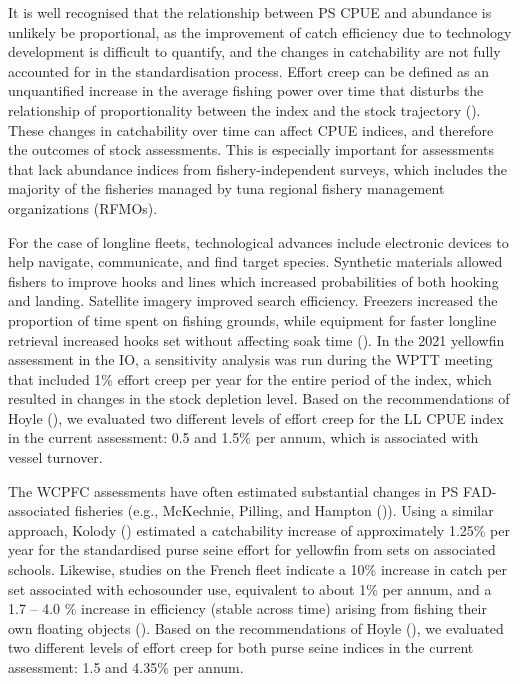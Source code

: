 \documentclass[
]{scrartcl}
\begin{document}
It is well recognised that the relationship between PS CPUE and
abundance is unlikely be proportional, as the improvement of catch
efficiency due to technology development is difficult to quantify, and
the changes in catchability are not fully accounted for in the
standardisation process. Effort creep can be defined as an unquantified
increase in the average fishing power over time that disturbs the
relationship of proportionality between the index and the stock
trajectory ().
These changes in catchability over time can affect CPUE indices, and
therefore the outcomes of stock assessments. This is especially
important for assessments that lack abundance indices from
fishery-independent surveys, which includes the majority of the
fisheries managed by tuna regional fishery management organizations
(RFMOs).

For the case of longline fleets, technological advances include
electronic devices to help navigate, communicate, and find target
species. Synthetic materials allowed fishers to improve hooks and lines
which increased probabilities of both hooking and landing. Satellite
imagery improved search efficiency. Freezers increased the proportion of
time spent on fishing grounds, while equipment for faster longline
retrieval increased hooks set without affecting soak time
(). In the 2021
yellowfin assessment in the IO, a sensitivity analysis was run during
the WPTT meeting that included 1\% effort creep per year for the entire
period of the index, which resulted in changes in the stock depletion
level. Based on the recommendations of Hoyle
(), we evaluated two
different levels of effort creep for the LL CPUE index in the current
assessment: 0.5 and 1.5\% per annum, which is associated with vessel
turnover.

The WCPFC assessments have often estimated substantial changes in PS
FAD-associated fisheries (e.g., McKechnie, Pilling, and Hampton
()). Using a
similar approach, Kolody
() estimated a
catchability increase of approximately 1.25\% per year for the
standardised purse seine effort for yellowfin from sets on associated
schools. Likewise, studies on the French fleet indicate a 10\% increase
in catch per set associated with echosounder use, equivalent to about
1\% per annum, and a 1.7 -- 4.0 \% increase in efficiency (stable across
time) arising from fishing their own floating objects
().
Based on the recommendations of Hoyle
(), we evaluated two
different levels of effort creep for both purse seine indices in the
current assessment: 1.5 and 4.35\% per annum.
\end{document}
